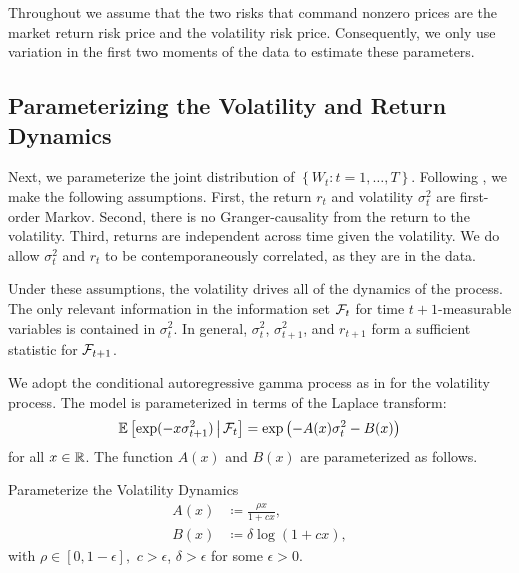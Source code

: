 Throughout we assume that the two risks that command nonzero prices are the market return risk price and the volatility risk price. Consequently, we only use variation in the first two moments of the data to estimate these parameters. 


\subsection{Parameterizing the Volatility and Return Dynamics}

Next, we parameterize the joint distribution of $\left\lbrace W_t:t=1,\ldots, T\right\rbrace $. 
Following \textcite{han2018leverage}, we make the following assumptions. First, the return $r_t$ and volatility $\sigma^2_t$ are first-order Markov. Second, there is no Granger-causality from the return to the volatility. Third, returns are independent across time given the volatility. We do allow $\sigma^2_{t}$ and $r_{t}$ to be contemporaneously correlated, as they are in the data. 

Under these assumptions, the volatility drives all of the dynamics of the process. The only relevant information in the information set $\mathcal{F}_{t}$ for time $t+1$-measurable variables is contained in $\sigma^2_t$. In general, $\sigma^2_t$, $\sigma^2_{t+1}$, and $r_{t+1}$ form a sufficient statistic for $\mathcal{F}_{t+1}$. 

We adopt the conditional autoregressive gamma process as in \textcite{gourieroux2006autoregressive, han2018leverage} for the volatility process. The model is parameterized in terms of the Laplace transform: 
%
\begin{equation}
    \operatorname{\mathbb{E}}\left[\exp(-x \sigma^2_{t+1}) \,\middle\vert\, \mathcal{F}_{t}\right] = \exp\left(- A(x) \sigma^2_{t} - B(x)\right)
    \label{eqn:vol_laplace_transform}
\end{equation}
%
for all $x \in \mathbb{R}$. The function $A(x)$ and $B(x)$ are parameterized as follows.

\begin{definition}{Parameterize the Volatility Dynamics}
     \label{defn:physical_vol_dynamics}
     \begin{align}
        \label{defn:a_PP}
        A(x) &\coloneqq \frac{\rho x}{1 + c x}, \\
        \label{defn:b_PP}
        B(x) &\coloneqq \delta \log(1 + c x),
     \end{align}
with $\rho \in [0,1-\epsilon],$ $c > \epsilon$, $\delta > \epsilon$ for some $\epsilon > 0$.
\end{definition}

